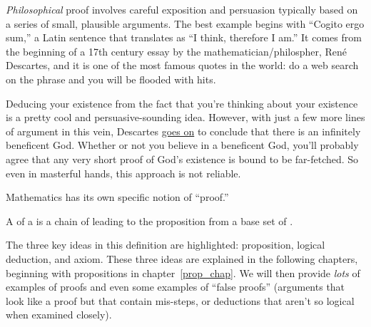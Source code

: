\emph{Philosophical} proof involves careful exposition and
persuasion typically based on a series of small, plausible arguments.
The best example begins with ``Cogito ergo sum,'' a Latin sentence
that translates as ``I think, therefore I am.''  It comes from the
beginning of a 17th century essay by the mathematician/philospher,
Ren\'e Descartes, and it is one of the most famous quotes in the
world: do a web search on the phrase and you will be flooded with
hits.

Deducing your existence from the fact that you're thinking about your
existence is a pretty cool and persuasive-sounding idea.
However, with just a few more lines of argument in this vein, Descartes
\href{http://www.btinternet.com/~glynhughes/squashed/descartes.htm}{goes
  on} to conclude that there is an infinitely beneficent God.  Whether
or not you believe in a beneficent God, you'll probably agree that any
very short proof of God's existence is bound to be far-fetched.  So even
in masterful hands, this approach is not reliable.

Mathematics has its own specific notion of ``proof.''

\begin{definition*}
A  of a  is a chain of  leading to the proposition from a base set of .
\end{definition*}

The three key ideas in this definition are highlighted: proposition,
logical deduction, and axiom.  These three ideas are explained in the
following chapters, beginning with propositions in
chapter~\ref{prop_chap}.  We will then provide \emph{lots} of examples
of proofs and even some examples of ``false proofs'' (\ie arguments
that look like a proof but that contain mis-steps, or deductions that
aren't so logical when examined closely).

\endinput

